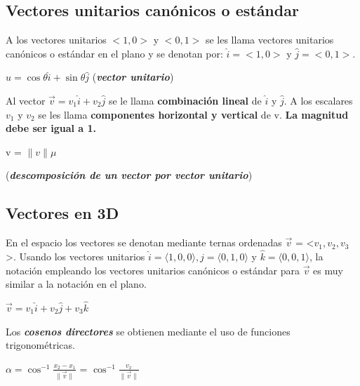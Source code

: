\documentclass[letterpaper,12pt]{article}
\begin{document}
\begin{sloppypar}
\subsection{Vectores unitarios canónicos o estándar}
\noindent A los vectores unitarios $<1,0>$ y $<0,1>$ se les llama vectores unitarios canónicos o estándar en el plano y se denotan por: $\hat{i} = <1,0 >$ y $\hat{j} = <0,1>$.

\begin{center}
    $u = \cos \theta \hat{i} + \sin \theta \hat{j}$   \textcolor[rgb]{1,0,0}{(\textbf{\textit{vector unitario}})}
\end{center}

\noindent Al vector $\vec{v} = v_1\hat{i} + v_2\hat{j}$ se le llama \textbf{combinación lineal} de $\hat{i}$ y $\hat{j}$. A los escalares $v_1$ y $v_2$ se les llama \textbf{componentes horizontal y vertical} de v. \textbf{La magnitud debe ser igual a 1.}



\begin{center}
    v = $\| v \| \mu $
    
    \textcolor[rgb]{1,0,0}{(\textbf{\textit{descomposición de un vector por vector unitario}})}
\end{center}


\subsection{Vectores en 3D}
\noindent En el espacio los vectores se denotan mediante ternas ordenadas $\vec{v}$ = <$v_1,v_2,v_3$>. Usando los vectores unitarios $\hat{i}= \langle1,0,0\rangle, \hat{j}=\langle 0,1,0\rangle$  y  $\hat{k}=\langle 0,0,1\rangle$, la notación empleando los vectores unitarios canónicos o estándar para $\vec{v}$ es muy similar a la notación en el plano.
\begin{center}
    
    $\vec{v} = v_1\hat{i} + v_2\hat{j}+v_3\hat{k}$
    
\end{center}

\noindent Los \textcolor[rgb]{1,0,0}{\textbf{\textit{cosenos directores}}} se obtienen mediante el uso de funciones trigonométricas.
\begin{center}
    $\displaystyle \alpha = \cos^{-1} \frac{x_2-x_1}{\| \vec{v} \| }$ = $\displaystyle \cos^{-1} \frac{v_x}{\| \vec{v} \| }$
    

\end{center}
\end{sloppypar}
\end{document}
